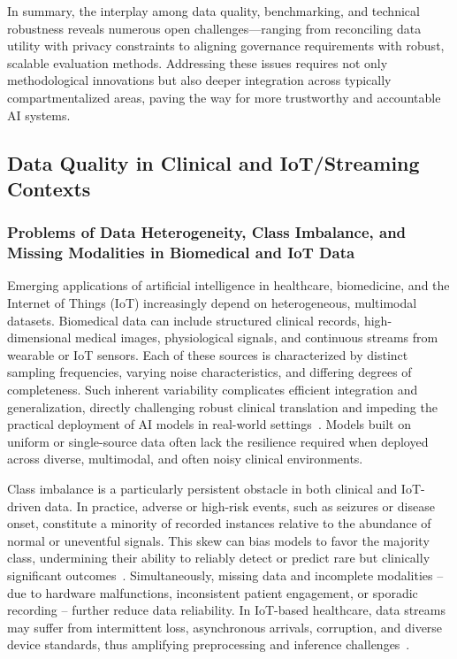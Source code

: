 \documentclass[sigconf]{acmart}
\begin{document}
In summary, the interplay among data quality, benchmarking, and technical robustness reveals numerous open challenges—ranging from reconciling data utility with privacy constraints to aligning governance requirements with robust, scalable evaluation methods. Addressing these issues requires not only methodological innovations but also deeper integration across typically compartmentalized areas, paving the way for more trustworthy and accountable AI systems.

\subsection{Data Quality in Clinical and IoT/Streaming Contexts}

\subsubsection{Problems of Data Heterogeneity, Class Imbalance, and Missing Modalities in Biomedical and IoT Data}

Emerging applications of artificial intelligence in healthcare, biomedicine, and the Internet of Things (IoT) increasingly depend on heterogeneous, multimodal datasets. Biomedical data can include structured clinical records, high-dimensional medical images, physiological signals, and continuous streams from wearable or IoT sensors. Each of these sources is characterized by distinct sampling frequencies, varying noise characteristics, and differing degrees of completeness. Such inherent variability complicates efficient integration and generalization, directly challenging robust clinical translation and impeding the practical deployment of AI models in real-world settings~\cite{ref78,ref82,ref83}. Models built on uniform or single-source data often lack the resilience required when deployed across diverse, multimodal, and often noisy clinical environments.

Class imbalance is a particularly persistent obstacle in both clinical and IoT-driven data. In practice, adverse or high-risk events, such as seizures or disease onset, constitute a minority of recorded instances relative to the abundance of normal or uneventful signals. This skew can bias models to favor the majority class, undermining their ability to reliably detect or predict rare but clinically significant outcomes~\cite{ref83,ref84}. Simultaneously, missing data and incomplete modalities -- due to hardware malfunctions, inconsistent patient engagement, or sporadic recording -- further reduce data reliability. In IoT-based healthcare, data streams may suffer from intermittent loss, asynchronous arrivals, corruption, and diverse device standards, thus amplifying preprocessing and inference challenges~\cite{ref90,ref106}.
\end{document}
